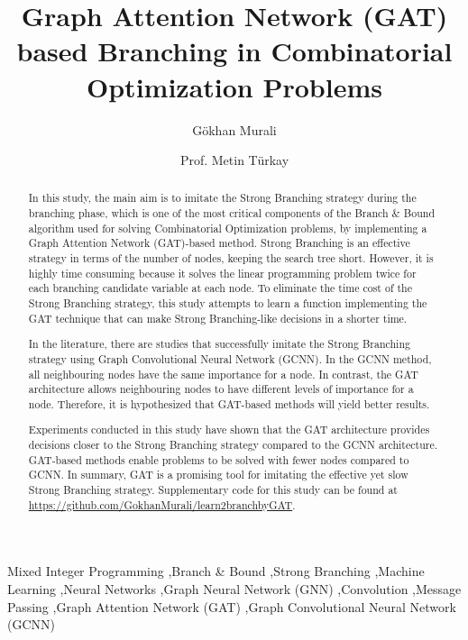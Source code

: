 \begin{frontmatter}

    \title{Graph Attention Network (GAT) based Branching in
Combinatorial Optimization Problems}

    \author[label1]{Gökhan Murali}
    \author[label1]{Prof. Metin Türkay}



    \begin{abstract}


        In this study, the main aim is to imitate the Strong Branching strategy during the branching phase, which is one of the most critical components of the Branch \& Bound algorithm used for solving Combinatorial Optimization problems, by implementing a Graph Attention Network (GAT)-based method.
        Strong Branching is an effective strategy in terms of the number of nodes, keeping the search tree short.
        However, it is highly time consuming because it solves the linear programming problem twice for each branching candidate variable at each node.
        To eliminate the time cost of the Strong Branching strategy, this study attempts to learn a function implementing the GAT technique that can make Strong Branching-like decisions in a shorter time.

        In the literature, there are studies that successfully imitate the Strong Branching strategy using Graph Convolutional Neural Network (GCNN). In the GCNN method, all neighbouring nodes have the same importance for a node.
        In contrast, the GAT  architecture allows neighbouring nodes to have different levels of importance for a node.
        Therefore, it is hypothesized that GAT-based methods will yield better results.

        Experiments conducted in this study have shown that the GAT architecture provides decisions closer to the Strong Branching strategy compared to the GCNN architecture.
        GAT-based methods enable problems to be solved with fewer nodes compared to GCNN.
        In summary, GAT is a promising tool for imitating the effective yet slow Strong Branching strategy.
        Supplementary code for this study can be found at \url{https://github.com/GokhanMurali/learn2branchbyGAT}.
    \end{abstract}


    \begin{keyword}
        Mixed Integer Programming \sep Branch \& Bound \sep Strong Branching \sep Machine Learning \sep Neural Networks \sep Graph Neural Network (GNN) \sep Convolution \sep Message Passing \sep Graph Attention Network (GAT) \sep Graph Convolutional Neural Network (GCNN)
    \end{keyword}

\end{frontmatter}
